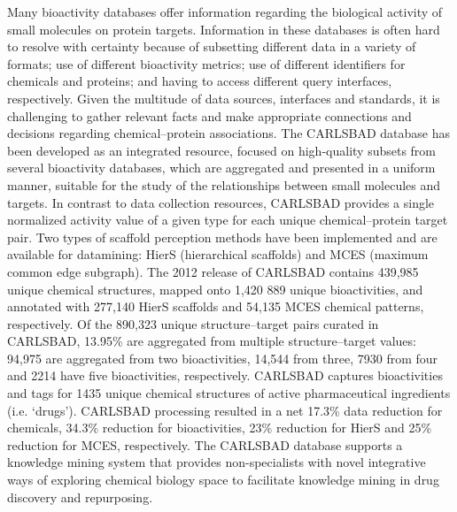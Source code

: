 Many bioactivity databases offer information regarding the biological activity of small molecules on protein targets. Information in these databases is often hard to resolve with certainty because of subsetting different data in a variety of formats; use of different bioactivity metrics; use of different identifiers for chemicals and proteins; and having to access different query interfaces, respectively. Given the multitude of data sources, interfaces and standards, it is challenging to gather relevant facts and make appropriate connections and decisions regarding chemical–protein associations. The CARLSBAD database has been developed as an integrated resource, focused on high-quality subsets from several bioactivity databases, which are aggregated and presented in a uniform manner, suitable for the study of the relationships between small molecules and targets. In contrast to data collection resources, CARLSBAD provides a single normalized activity value of a given type for each unique chemical–protein target pair. Two types of scaffold perception methods have been implemented and are available for datamining: HierS (hierarchical scaffolds) and MCES (maximum common edge subgraph). The 2012 release of CARLSBAD contains 439,985 unique chemical structures, mapped onto 1,420 889 unique bioactivities, and annotated with 277,140 HierS scaffolds and 54,135 MCES chemical patterns, respectively. Of the 890,323 unique structure–target pairs curated in CARLSBAD, 13.95\% are aggregated from multiple structure–target values: 94,975 are aggregated from two bioactivities, 14,544 from three, 7930 from four and 2214 have five bioactivities, respectively. CARLSBAD captures bioactivities and tags for 1435 unique chemical structures of active pharmaceutical ingredients (i.e. ‘drugs’). CARLSBAD processing resulted in a net 17.3\% data reduction for chemicals, 34.3\% reduction for bioactivities, 23\% reduction for HierS and 25\% reduction for MCES, respectively. The CARLSBAD database supports a knowledge mining system that provides non-specialists with novel integrative ways of exploring chemical biology space to facilitate knowledge mining in drug discovery and repurposing.


